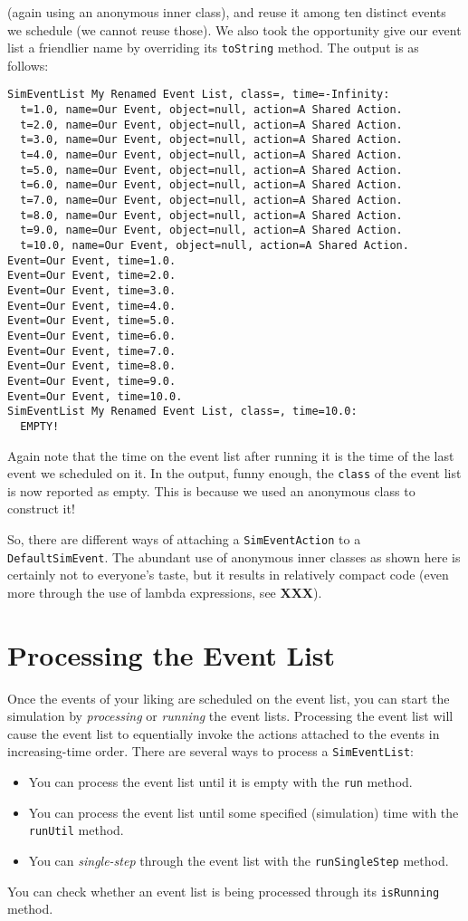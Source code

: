   (again using an anonymous inner class),
  and reuse it among ten distinct events we schedule
  (we cannot reuse those).
We also took the opportunity give our
  event list a friendlier name by overriding its \lstinline{toString} method.
The output is as follows:
\begin{lstlisting}[basicstyle=\tiny]
SimEventList My Renamed Event List, class=, time=-Infinity:
  t=1.0, name=Our Event, object=null, action=A Shared Action.
  t=2.0, name=Our Event, object=null, action=A Shared Action.
  t=3.0, name=Our Event, object=null, action=A Shared Action.
  t=4.0, name=Our Event, object=null, action=A Shared Action.
  t=5.0, name=Our Event, object=null, action=A Shared Action.
  t=6.0, name=Our Event, object=null, action=A Shared Action.
  t=7.0, name=Our Event, object=null, action=A Shared Action.
  t=8.0, name=Our Event, object=null, action=A Shared Action.
  t=9.0, name=Our Event, object=null, action=A Shared Action.
  t=10.0, name=Our Event, object=null, action=A Shared Action.
Event=Our Event, time=1.0.
Event=Our Event, time=2.0.
Event=Our Event, time=3.0.
Event=Our Event, time=4.0.
Event=Our Event, time=5.0.
Event=Our Event, time=6.0.
Event=Our Event, time=7.0.
Event=Our Event, time=8.0.
Event=Our Event, time=9.0.
Event=Our Event, time=10.0.
SimEventList My Renamed Event List, class=, time=10.0:
  EMPTY!
\end{lstlisting}
Again note that the time on the event list after running it
  is the time of the last event we scheduled on it.
In the output, funny enough, the \lstinline{class} of the event list
  is now reported as empty.
This is because we used an anonymous class to construct it!

So, there are different ways of attaching a \lstinline{SimEventAction}
  to a \lstinline{DefaultSimEvent}.
The abundant use of anonymous inner classes as shown here
  is certainly not to everyone's taste,
  but it results in relatively compact code
  (even more through the use of lambda expressions, see {\bf XXX}).

\section{Processing the Event List}

Once the events of your liking are scheduled on the event list,
  you can start the simulation by {\em processing\/} or {\em running\/}
  the event lists.
Processing the event list will cause the event list to
  equentially invoke the actions attached to the events
  in increasing-time order.
There are several ways to process a \lstinline{SimEventList}:
\begin{itemize}
  \item You can process the event list until it is empty with the \lstinline{run} method.
  \item You can process the event list until some specified (simulation) time with the
          \lstinline{runUtil} method.
  \item You can {\em single-step\/} through the event list with the
          \lstinline{runSingleStep} method.
\end{itemize}
You can check whether an event list is being processed through its \lstinline{isRunning}
  method.

